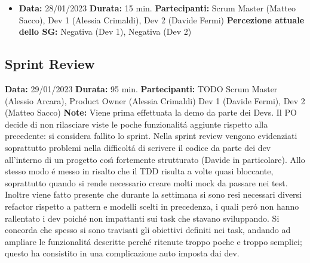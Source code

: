 \documentclass{article}
\begin{document}
    \begin{itemize}
        \item \textbf{Data:} 28/01/2023
        \newline \textbf{Durata:} 15 min.
        \newline \textbf{Partecipanti:} Scrum Master (Matteo Sacco), Dev 1 (Alessia Crimaldi), Dev 2 (Davide Fermi)
        \newline \textbf{Percezione attuale dello SG:} Negativa (Dev 1), Negativa (Dev 2)
    \end{itemize}




    \subsection{Sprint Review}
    \textbf{Data:} 29/01/2023
    \newline \textbf{Durata:} 95 min.
    \newline \textbf{Partecipanti:} TODO Scrum Master (Alessio Arcara), Product Owner (Alessia Crimaldi) Dev 1 (Davide Fermi), Dev 2 (Matteo Sacco)
    \newline \textbf{Note:} Viene prima effettuata la demo da parte dei Devs. Il PO decide di non rilasciare viste le poche funzionalit\'a aggiunte rispetto alla precedente: si considera fallito lo sprint.
    \newline Nella sprint review vengono evidenziati soprattutto problemi nella difficolt\'a di scrivere il codice da parte dei dev all'interno di un progetto cos\'{\i} fortemente strutturato (Davide in particolare). Allo stesso modo \'e messo in risalto che il TDD risulta a volte quasi bloccante, soprattutto quando si rende necessario creare molti mock da passare nei test. Inoltre viene fatto presente che durante la settimana si sono resi necessari diversi refactor rispetto a pattern e modelli scelti in precedenza, i quali per\'o non hanno rallentato i dev poich\'e non impattanti sui task che stavano sviluppando.
    \newline Si concorda che spesso si sono travisati gli obiettivi definiti nei task, andando ad ampliare le funzionalit\'a descritte perch\'e ritenute troppo poche e troppo semplici; questo ha consistito in una complicazione auto imposta dai dev.
    \newline
\end{document}

